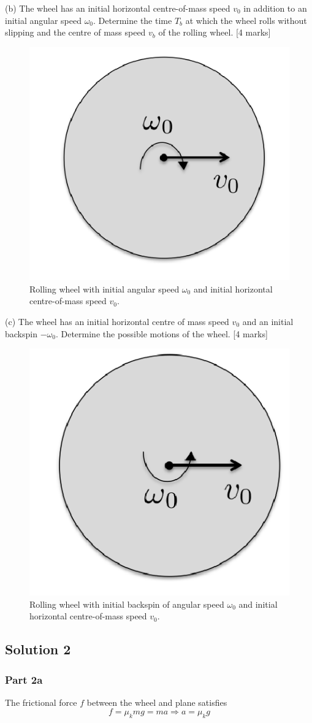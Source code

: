 \documentclass{article}
\begin{document}
(b) The wheel has an initial horizontal centre-of-mass speed $v_{0}$ in addition to an initial angular speed $\omega_{0}$. Determine the time $T_{b}$ at which the wheel rolls without slipping and the centre of mass speed $v_{b}$ of the rolling wheel. [4 marks] 
\begin{figure}
	\centering
	\includegraphics[width=0.5\linewidth]{spho_book_TYS_images/2016q2_2.png}
	\caption{Rolling wheel with initial angular speed $\omega_{0}$ and initial horizontal centre-of-mass speed $v_{0}$.}
\end{figure}

(c) The wheel has an initial horizontal centre of mass speed $v_{0}$ and an initial backspin $-\omega_{0}$. Determine the possible motions of the wheel. [4 marks]
\begin{figure}
	\includegraphics[width=0.5\linewidth]{spho_book_TYS_images/2016q2_3.png}
	\caption{Rolling wheel with initial backspin of angular speed $\omega_{0}$ and initial horizontal centre-of-mass speed $v_{0}$.}
\end{figure}

\pagebreak

\subsection{Solution 2}
\subsubsection{Part 2a}
The frictional force $f$ between the wheel and plane satisfies
\[f = \mu_k mg = ma \Rightarrow a = \mu_k g\]
\end{document}
